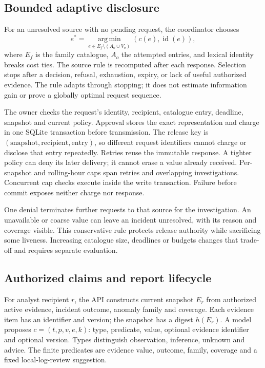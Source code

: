 \documentclass[conference,letterpaper]{IEEEtran}
\begin{document}
\subsection{Bounded adaptive disclosure}
For an unresolved source with no pending request, the coordinator chooses
\begin{equation}
e^*=\operatorname*{arg\,min}_{e\in E_f\setminus(A_o\cup V_o)}(c(e),\operatorname{id}(e)),
\label{eq:select}
\end{equation}
where $E_f$ is the family catalogue, $A_o$ the attempted entries, and lexical identity breaks cost ties. The source rule is recomputed after each response. Selection stops after a decision, refusal, exhaustion, expiry, or lack of useful authorized evidence. The rule adapts through stopping; it does not estimate information gain or prove a globally optimal request sequence.

The owner checks the request's identity, recipient, catalogue entry, deadline, snapshot and current policy. Approval stores the exact representation and charge in one SQLite transaction before transmission. The release key is $(\text{snapshot},\text{recipient},\text{entry})$, so different request identifiers cannot charge or disclose that entry repeatedly. Retries reuse the immutable response. A tighter policy can deny its later delivery; it cannot erase a value already received. Per-snapshot and rolling-hour caps span retries and overlapping investigations. Concurrent cap checks execute inside the write transaction. Failure before commit exposes neither charge nor response.

One denial terminates further requests to that source for the investigation. An unavailable or coarse value can leave an incident unresolved, with its reason and coverage visible. This conservative rule protects release authority while sacrificing some liveness. Increasing catalogue size, deadlines or budgets changes that trade-off and requires separate evaluation.

\subsection{Authorized claims and report lifecycle}
For analyst recipient $r$, the API constructs current snapshot $E_r$ from authorized active evidence, incident outcome, anomaly family and coverage. Each evidence item has an identifier and version; the snapshot has a digest $h(E_r)$. A model proposes $c=(t,p,v,e,k)$: type, predicate, value, optional evidence identifier and optional version. Types distinguish observation, inference, unknown and advice. The finite predicates are evidence value, outcome, family, coverage and a fixed local-log-review suggestion.
\end{document}
